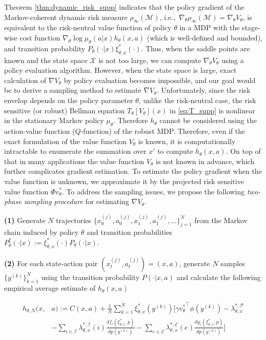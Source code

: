 Theorem \ref{thm:dynamic_risk_supp} indicates that the policy gradient of the Markov-coherent dynamic risk measure $\rho_\infty(\mathcal M)$, i.e.,~$\nabla_\theta\rho_\infty(\mathcal M)=\nabla_\theta V_\theta$, is equivalent to the risk-neutral value function of policy $\theta$ in a MDP with the stage-wise cost function $\nabla_\theta\log\mu_\theta(a|x)h_\theta(x,a)$ (which is well-defined and bounded), and transition probability $P_\theta(\cdot|x)\xi_{\theta,x}^*(\cdot)$. Thus, when the saddle points are known and the state space $\mathcal X$ is not too large, we can compute $\nabla_\theta V_\theta$ using a policy evaluation algorithm. However, when the state space is large, exact calculation of $\nabla V_\theta$ by policy evaluation becomes impossible, and our goal would be to derive a sampling method to estimate $\nabla V_\theta$. Unfortunately, since the risk envelop depends on the policy parameter $\theta$, unlike the risk-neutral case, the risk sensitive (or robust) Bellman equation $T_\theta[V_\theta](x)$ in \eqref{eq:T_supp} is nonlinear in the stationary Markov policy $\mu_\theta$. Therefore $h_\theta$ cannot be considered using the action-value function ($Q$-function) of the robust MDP. Therefore, even if the exact formulation of the value function $V_\theta$ is known, it is computationally intractable to enumerate the summation over $x'$ to compute $h_\theta(x,a)$. On top of that in many applications the value function $V_\theta$ is not known in advance, which further complicates gradient estimation. To estimate the policy gradient when the value function is unknown, we approximate it by the projected risk sensitive value function $\Phi v_\theta^*$. To address the sampling issues, we propose the following \emph{two-phase sampling procedure} for estimating $\nabla V_\theta$.

{\bf (1)} Generate $N$ trajectories $\{x^{(j)}_0,a^{(j)}_0,x^{(j)}_1,a^{(j)}_1,\ldots\}_{j=1}^N$ from the Markov chain induced by policy $\theta$ and transition probabilities $P^\xi_{\theta}(\cdot|x):=\xi_{\theta,x}^*(\cdot)P_\theta(\cdot|x)$.

{\bf (2)} For each state-action pair $(x^{(j)}_t,a^{(j)}_t)=(x,a)$, generate $N$ samples $\{y^{(k)}\}_{k=1}^N$ using the transition probability $P(\cdot|x,a)$ and calculate the following empirical average estimate of $h_\theta(x,a)$

\vspace{-0.25in}
\begin{small}
\begin{align*}
h_{\theta,N}(x,&a):=C(x,a)+\frac{1}{N}\sum_{k=1}^N\xi^*_{\theta,x}(y^{(k)})\Bigg[\gamma {v_\theta^*}^\top\phi(y^{(k)})-{\lambda}^{*,\mathcal P}_{\theta,x} \\
&-\sum_{i\in\mathcal I}{\lambda}^{*,\mathcal I}_{\theta,x}(i)\frac{d f_i(\xi^*_{\theta,x},p)}{d p(y^{(k)})}-\sum_{e\in\mathcal E}{\lambda}^{*,\mathcal E}_{\theta,x}(e) \frac{d g_e(\xi^*_{\theta,x},p)}{d p(y^{(k)})}\Bigg]
\end{align*}
\end{small}
\vspace{-0.2in}

